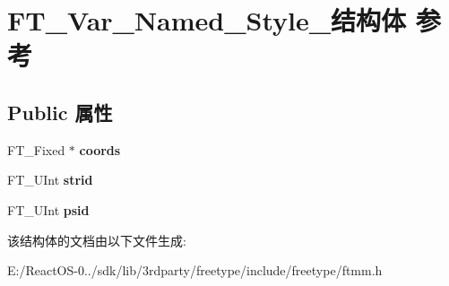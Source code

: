 \hypertarget{struct_f_t___var___named___style__}{}\section{F\+T\+\_\+\+Var\+\_\+\+Named\+\_\+\+Style\+\_\+结构体 参考}
\label{struct_f_t___var___named___style__}
\subsection*{Public 属性}
\begin{DoxyCompactItemize}
\item 
\mbox{\label{struct_f_t___var___named___style___a07195d55aee541db651ef3a8b04bb41f}} 
F\+T\+\_\+\+Fixed $\ast$ {\bfseries coords}
\item 
\mbox{\label{struct_f_t___var___named___style___a7802f6958c6e883bdce16b9931002826}} 
F\+T\+\_\+\+U\+Int {\bfseries strid}
\item 
\mbox{\label{struct_f_t___var___named___style___a91b36c5ad8302f454399b6091c5ce170}} 
F\+T\+\_\+\+U\+Int {\bfseries psid}
\end{DoxyCompactItemize}


该结构体的文档由以下文件生成\+:\begin{DoxyCompactItemize}
\item 
E\+:/\+React\+O\+S-\/0../sdk/lib/3rdparty/freetype/include/freetype/ftmm.\+h\end{DoxyCompactItemize}
